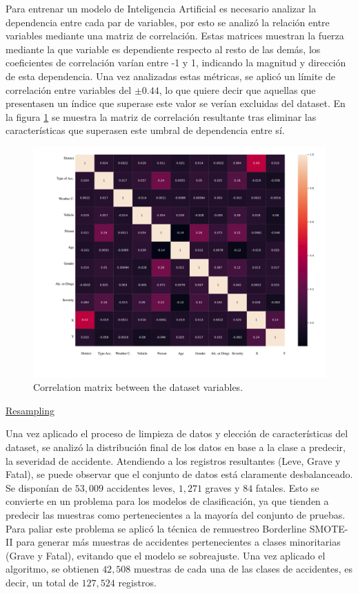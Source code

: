 \documentclass{uathesis-es}
\begin{document}

Para entrenar un modelo de Inteligencia Artificial es necesario analizar la dependencia entre cada par de variables, por esto se analizó la relación entre variables mediante una matriz de correlación. Estas matrices muestran la fuerza mediante la que variable es dependiente respecto al resto de las demás, los coeficientes de correlación varían entre -1 y 1, indicando la magnitud y dirección de esta dependencia. Una vez analizadas estas métricas, se aplicó un límite de correlación entre variables del $\pm 0.44$, lo que quiere decir que aquellas que presentasen un índice que superase este valor se verían excluidas del dataset. En la figura \ref{CorrelationMatrix} se muestra la matriz de correlación resultante tras eliminar las características que superasen este umbral de dependencia entre sí.


 \begin{figure}[H]
	\centering
	\includegraphics[width=12cm]{Figures/1stPaper/CorrelationMatrix.png}
	\caption{Correlation matrix between the dataset variables.}
	\label{CorrelationMatrix}
\end{figure}



\underline{Resampling}

Una vez aplicado el proceso de limpieza de datos y elección de características del dataset, se analizó la distribución final de los datos en base a la clase a predecir, la severidad de accidente. Atendiendo a los registros resultantes (Leve, Grave y Fatal), se puede observar que el conjunto de datos está claramente desbalanceado. Se disponían de $53,009$ accidentes leves, $1,271$ graves y $84$ fatales. Esto se convierte en un problema para los modelos de clasificación, ya que tienden a predecir las muestras como pertenecientes a la mayoría del conjunto de pruebas. Para paliar este problema se aplicó la técnica de remuestreo Borderline SMOTE-II para generar más muestras de accidentes pertenecientes a clases minoritarias (Grave y Fatal), evitando que el modelo se sobreajuste. Una vez aplicado el algoritmo, se obtienen $42,508$ muestras de cada una de las clases de accidentes, es decir, un total de $127,524$ registros.
\end{document}
